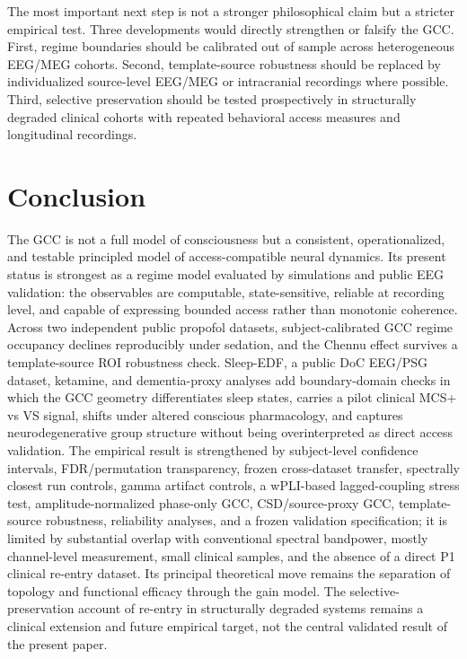 \documentclass[11pt,a4paper]{article}
\theoremstyle{plain}
\theoremstyle{definition}
\theoremstyle{remark}
\begin{document}
The most important next step is not a stronger philosophical claim but a stricter empirical test. Three developments would directly strengthen or falsify the GCC. First, regime boundaries should be calibrated out of sample across heterogeneous EEG/MEG cohorts. Second, template-source robustness should be replaced by individualized source-level EEG/MEG or intracranial recordings where possible. Third, selective preservation should be tested prospectively in structurally degraded clinical cohorts with repeated behavioral access measures and longitudinal recordings.

\section{Conclusion}
\label{sec:schluss}

The GCC is not a full model of consciousness but a consistent, operationalized, and testable principled model of access-compatible neural dynamics. Its present status is strongest as a regime model evaluated by simulations and public EEG validation: the observables are computable, state-sensitive, reliable at recording level, and capable of expressing bounded access rather than monotonic coherence. Across two independent public propofol datasets, subject-calibrated GCC regime occupancy declines reproducibly under sedation, and the Chennu effect survives a template-source ROI robustness check. Sleep-EDF, a public DoC EEG/PSG dataset, ketamine, and dementia-proxy analyses add boundary-domain checks in which the GCC geometry differentiates sleep states, carries a pilot clinical MCS+ vs VS signal, shifts under altered conscious pharmacology, and captures neurodegenerative group structure without being overinterpreted as direct access validation. The empirical result is strengthened by subject-level confidence intervals, FDR/permutation transparency, frozen cross-dataset transfer, spectrally closest run controls, gamma artifact controls, a wPLI-based lagged-coupling stress test, amplitude-normalized phase-only GCC, CSD/source-proxy GCC, template-source robustness, reliability analyses, and a frozen validation specification; it is limited by substantial overlap with conventional spectral bandpower, mostly channel-level measurement, small clinical samples, and the absence of a direct P1 clinical re-entry dataset. Its principal theoretical move remains the separation of topology and functional efficacy through the gain model. The selective-preservation account of re-entry in structurally degraded systems remains a clinical extension and future empirical target, not the central validated result of the present paper.
\end{document}

